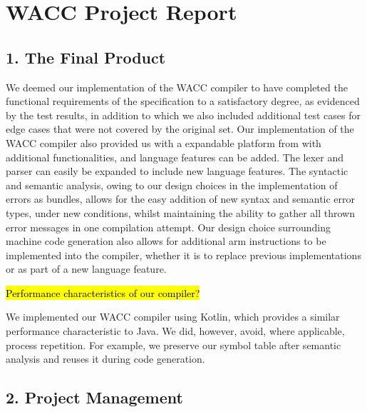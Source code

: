 \documentclass[10pt,a4paper]{report}
\begin{document}
  \section*{WACC Project Report}


  \subsection*{1. The Final Product}

  We deemed our implementation of the WACC compiler to have completed the
  functional requirements of the specification to a satisfactory degree, as
  evidenced by the test results, in addition to which we also included
  additional test cases for edge cases that were not covered by the original set.
  Our implementation of the WACC compiler also provided us with a expandable
  platform from with additional functionalities, and language features can be
  added. The lexer and parser can easily be expanded to include new language
  features. The syntactic and semantic analysis, owing to our design choices in
  the implementation of errors as bundles, allows for the easy addition of new
  syntax and semantic error types, under new conditions, whilst maintaining the
  ability to gather all thrown error messages in one compilation attempt.
  Our design choice surrounding machine code generation also allows for
  additional arm instructions to be implemented into the compiler, whether it is
  to replace previous implementations or as part of a new language feature.

  \hl{Performance characteristics of our compiler?}

  We implemented our WACC compiler using Kotlin, which provides a similar
  performance characteristic to Java. We did, however, avoid, where applicable,
  process repetition. For example, we preserve our symbol table after semantic
  analysis and reuses it during code generation.


  \subsection*{2. Project Management}
\end{document}
